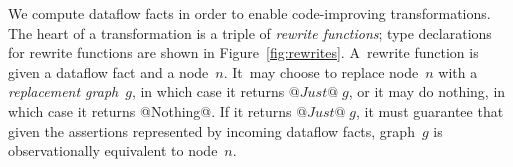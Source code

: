 \documentclass[blockstyle,preprint,natbib,nocopyrightspace]{sigplanconf}
\def\authornote#1{\unskip\relax}
\newcommand{\simon}[1]{\authornote{SLPJ: #1}}
\newcommand\figref[1]{Figure~\ref{fig:#1}}
\begin{document}
We compute dataflow facts in order to enable code-improving
transformations. \simon{Our library provides a function
that performs (interleaved) analysis and transformation on the
graph, which we describe in this section. New paragraph.}
The heart of a transformation is a triple of
\emph{rewrite functions};
type declarations for rewrite functions are
shown in \figref{rewrites}. 
%
A~rewrite function is given a dataflow fact and a node~$n$.
It~may choose to replace node~$n$ with a \emph{replacement graph}~$g$,
in which case it 
returns $@Just@\;g$, or it may do nothing, in which case it returns @Nothing@.
If it returns $@Just@\;g$, it must guarantee that given
the assertions represented by incoming dataflow facts,
graph~$g$ is observationally equivalent to node~$n$.
\simon{Doesn't the rewrite have to be monotonic wrt the analysis?
NR~\&~JD: we're pretty sure not.  For scrutiny, we've reinserted your long comment,
but in your example, once $x$ is deemed live it stays live, because
facts at labels increase monotonically.
(Also, the only interesting partial order we're aware of is Tony Hoare's
``implements'' relation.  That might actually be permissible, but we
have used the stronger requirement of observational equivalence.
In~code generation these will be equivalent because of
determinism. ---NR)
}
\end{document}
